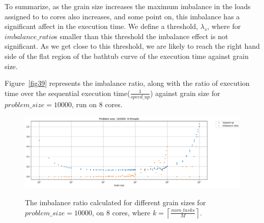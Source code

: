 To summarize, as the grain size increases the maximum imbalance in the loads assigned to to cores also increases, and some point on, this imbalance has a significant affect in the execution time. We define a threshold, $\lambda_s$, where for $imbalance\_{ratio}$s smaller than this threshold the imbalance effect is not significant. As we get close to this threshold, we are likely to reach the right hand side of the flat region of the bathtub curve of the execution time against grain size. 


Figure~\ref{fig39} represents the imbalance ratio, along with the ratio of execution time over the sequential execution time($\frac{1}{speed\_{up}}$) against grain size for $problem\_size=10000$, run on 8 cores.   

\vspace{\baselineskip}	
\begin{figure}[H]
	\centering
	{\includegraphics[scale=.45]{images/hpx_for_loop/w_c_speedup.png}}
	\caption{The imbalance ratio calculated for different grain sizes for $problem\_size=10000$, on 8 cores, where $k=\left\lceil{\frac{num\_{tasks}}{M}}\right \rceil$.}\label{fig37}		
\end{figure}


